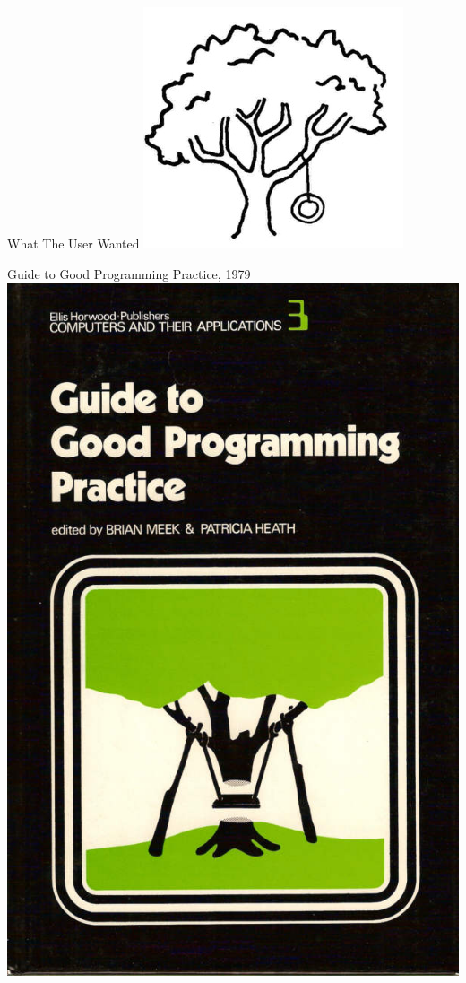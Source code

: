 \documentclass{beamer}
\begin{document}
\begin{frame}[t]{What The User Wanted}
    \centering
    \includegraphics[width=.4\textwidth]{treecust.jpg}
\end{frame}

\begin{frame}[t]{Guide to Good Programming Practice, 1979}
    \centering
    \includegraphics[width=.4\textwidth]{treeswing_computer_book_cover.jpg}
\end{frame}
\end{document}
